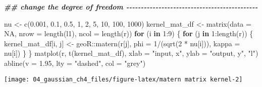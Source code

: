 \documentclass[
]{article}
\newenvironment{Shaded}{\begin{snugshade}}{\end{snugshade}}
\newcommand{\AttributeTok}[1]{\textcolor[rgb]{0.77,0.63,0.00}{#1}}
\newcommand{\ConstantTok}[1]{\textcolor[rgb]{0.00,0.00,0.00}{#1}}
\newcommand{\ControlFlowTok}[1]{\textcolor[rgb]{0.13,0.29,0.53}{\textbf{#1}}}
\newcommand{\DecValTok}[1]{\textcolor[rgb]{0.00,0.00,0.81}{#1}}
\newcommand{\DocumentationTok}[1]{\textcolor[rgb]{0.56,0.35,0.01}{\textbf{\textit{#1}}}}
\newcommand{\FloatTok}[1]{\textcolor[rgb]{0.00,0.00,0.81}{#1}}
\newcommand{\FunctionTok}[1]{\textcolor[rgb]{0.00,0.00,0.00}{#1}}
\newcommand{\NormalTok}[1]{#1}
\newcommand{\OtherTok}[1]{\textcolor[rgb]{0.56,0.35,0.01}{#1}}
\newcommand{\SpecialCharTok}[1]{\textcolor[rgb]{0.00,0.00,0.00}{#1}}
\newcommand{\StringTok}[1]{\textcolor[rgb]{0.31,0.60,0.02}{#1}}
\begin{document}
\begin{Shaded}
\begin{Highlighting}[]
\DocumentationTok{\#\# change the degree of freedom {-}{-}{-}{-}{-}{-}{-}{-}{-}{-}{-}{-}{-}{-}{-}{-}{-}{-}{-}{-}{-}{-}{-}{-}{-}{-}{-}{-}{-}{-}{-}{-}{-}{-}{-}{-}{-}{-}{-}{-}{-}{-}{-}{-}{-}}

\NormalTok{nu }\OtherTok{\textless{}{-}} \FunctionTok{c}\NormalTok{(}\FloatTok{0.001}\NormalTok{, }\FloatTok{0.1}\NormalTok{, }\FloatTok{0.5}\NormalTok{,}
        \DecValTok{1}\NormalTok{, }\DecValTok{2}\NormalTok{, }\DecValTok{5}\NormalTok{, }
        \DecValTok{10}\NormalTok{, }\DecValTok{100}\NormalTok{, }\DecValTok{1000}\NormalTok{)}
\NormalTok{kernel\_mat\_df }\OtherTok{\textless{}{-}} \FunctionTok{matrix}\NormalTok{(}\AttributeTok{data =} \ConstantTok{NA}\NormalTok{, }\AttributeTok{nrow =} \FunctionTok{length}\NormalTok{(l1), }\AttributeTok{ncol =} \FunctionTok{length}\NormalTok{(r))}
\ControlFlowTok{for}\NormalTok{ (i }\ControlFlowTok{in} \DecValTok{1}\SpecialCharTok{:}\DecValTok{9}\NormalTok{) \{}
  \ControlFlowTok{for}\NormalTok{ (j }\ControlFlowTok{in} \DecValTok{1}\SpecialCharTok{:}\FunctionTok{length}\NormalTok{(r)) \{}
\NormalTok{    kernel\_mat\_df[i, j] }\OtherTok{\textless{}{-}}\NormalTok{ geoR}\SpecialCharTok{::}\FunctionTok{matern}\NormalTok{(r[j], }
                                        \AttributeTok{phi =} \DecValTok{1}\SpecialCharTok{/}\NormalTok{(}\FunctionTok{sqrt}\NormalTok{(}\DecValTok{2} \SpecialCharTok{*}\NormalTok{ nu[i])), }
                                        \AttributeTok{kappa =}\NormalTok{ nu[i])}
\NormalTok{  \}}
\NormalTok{\}}
\FunctionTok{matplot}\NormalTok{(r, }\FunctionTok{t}\NormalTok{(kernel\_mat\_df), }
        \AttributeTok{xlab =} \StringTok{"input, x"}\NormalTok{, }\AttributeTok{ylab =} \StringTok{"output, y"}\NormalTok{, }
        \StringTok{"l"}\NormalTok{)}
\FunctionTok{abline}\NormalTok{(}\AttributeTok{v =} \FloatTok{1.95}\NormalTok{, }\AttributeTok{lty =} \StringTok{"dashed"}\NormalTok{, }\AttributeTok{col =} \StringTok{"grey"}\NormalTok{)}
\end{Highlighting}
\end{Shaded}

\begin{center}\texttt{[image: 04\_gaussian\_ch4\_files/figure-latex/matern matrix kernel-2]} \end{center}
\end{document}
